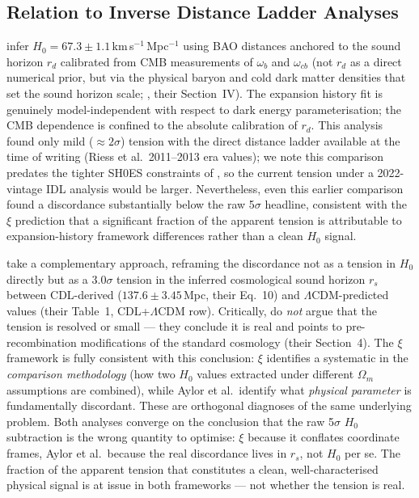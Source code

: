 \documentclass[usenatbib]{mnras}
\begin{document}
\subsection{Relation to Inverse Distance Ladder Analyses}

\citet{aubourg2015} infer $H_0 = 67.3 \pm 1.1$\,km\,s$^{-1}$\,Mpc$^{-1}$ using
BAO distances anchored to the sound horizon $r_d$ calibrated from CMB measurements
of $\omega_b$ and $\omega_{cb}$ (not $r_d$ as a direct numerical prior, but via the
physical baryon and cold dark matter densities that set the sound horizon scale;
\citealt{aubourg2015}, their Section~IV). The expansion history fit is genuinely
model-independent with respect to dark energy parameterisation; the CMB dependence
is confined to the absolute calibration of $r_d$. This analysis found only mild
($\approx 2\sigma$) tension with the direct distance ladder available at the time
of writing (Riess et al.\ 2011--2013 era values); we note this comparison predates
the tighter SH0ES constraints of \citet{riess2022}, so the current tension under
a 2022-vintage IDL analysis would be larger. Nevertheless, even this earlier
comparison found a discordance substantially below the raw 5$\sigma$ headline,
consistent with the $\xi$ prediction that a significant fraction of the apparent
tension is attributable to expansion-history framework differences rather than
a clean $H_0$ signal.

\citet{aylor2019} take a complementary approach, reframing the discordance not as
a tension in $H_0$ directly but as a $3.0\sigma$ tension in the inferred cosmological
sound horizon $r_s$ between CDL-derived ($137.6 \pm 3.45$\,Mpc, their Eq.~10) and
$\Lambda$CDM-predicted values (their Table~1, CDL+$\Lambda$CDM row). Critically,
\citet{aylor2019} do \emph{not} argue that the tension is resolved or small ---
they conclude it is real and points to pre-recombination modifications of the
standard cosmology (their Section~4). The $\xi$ framework is fully consistent with
this conclusion: $\xi$ identifies a systematic in the \emph{comparison methodology}
(how two $H_0$ values extracted under different $\Omega_m$ assumptions are
combined), while Aylor et al.\ identify what \emph{physical parameter} is
fundamentally discordant. These are orthogonal diagnoses of the same underlying
problem. Both analyses converge on the conclusion that the raw 5$\sigma$ $H_0$
subtraction is the wrong quantity to optimise: $\xi$ because it conflates
coordinate frames, Aylor et al.\ because the real discordance lives in $r_s$,
not $H_0$ per se. The fraction of the apparent tension that constitutes a
clean, well-characterised physical signal is at issue in both frameworks ---
not whether the tension is real.
\end{document}
